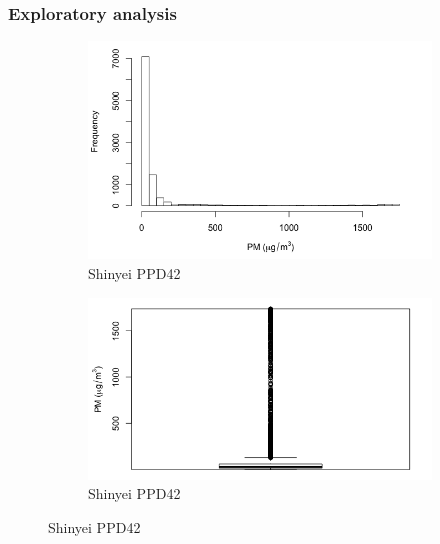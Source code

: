 \documentclass[11pt]{report}
\begin{document}
\subsubsection{Exploratory analysis}

\begin{figure}[!tbp]
    \begin{minipage}{1\linewidth}
        \centering
            \begin{subfigure}[t]{.4\linewidth}
                \includegraphics[width=\textwidth]{images/pm_histogram}
                \caption{Shinyei PPD42}
                \label{fig:pm_histogram}
            \end{subfigure}
            \hfill
            \begin{subfigure}[t]{.4\linewidth}
            	\includegraphics[width=\textwidth]{images/pm_boxplot}
            	\caption{Shinyei PPD42}
            	\label{fig:pm_boxplot}
	   \end{subfigure}
        \end{minipage}
    \begin{minipage}{1\linewidth}

\end{minipage}
\end{figure}
\end{document}
